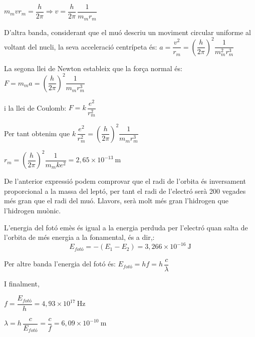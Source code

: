\begin{solapartat}
 $m_m v r_m = \dfrac{h}{2\pi} \Rightarrow v = \dfrac{h}{2\pi}\,\dfrac{1}{m_m r_m}$

 D'altra banda, considerant que el muó descriu un moviment circular uniforme al voltant del nucli, la seva acceleració centrípeta és: $a = \dfrac{v^2}{r_m} = \left(\dfrac{h}{2\pi}\right)^2\dfrac{1}{m_m^2 r_m^3}$

 La segona llei de Newton estableix que la força normal és: $F = m_m a = \left(\dfrac{h}{2\pi}\right)^2\dfrac{1}{m_m r_m^3}$

 i la llei de Coulomb: $F = k\,\dfrac{e^2}{r_m^2}$

 Per tant obtenim que $k\,\dfrac{e^2}{r_m^2} = \left(\dfrac{h}{2\pi}\right)^2\dfrac{1}{m_m r_m^3}$

$r_m = \left(\dfrac{h}{2\pi}\right)^2\dfrac{1}{m_m k e^2} = 2,65\times 10^{-13}\ \mathrm{m}$ \quad {}

 De l'anterior expressió podem comprovar que el radi de l'orbita és inversament proporcional a la massa del leptó, per tant el radi de l'electró serà 200 vegades més gran que el radi del muó. Llavors, serà molt més gran l'hidrogen que l'hidrogen muònic.
\end{solapartat}

\begin{solapartat}
 L'energia del fotó emès és igual a la energia perduda per l'electró quan salta de l'orbita de més energia a la fonamental, és a dir,:
\[ E_{\textit{fotó}} = -(E_1 - E_2) = 3,266\times 10^{-16}\ \mathrm{J} \]

 Per altre banda l'energia del fotó és: $E_{\textit{fotó}} = hf = h\,\dfrac{c}{\lambda}$

I finalment,

 $f = \dfrac{E_{\textit{fotó}}}{h} = 4,93\times 10^{17}\ \mathrm{Hz}$

 $\lambda = h\,\dfrac{c}{E_{\textit{fotó}}} = \dfrac{c}{f} = 6,09\times 10^{-10}\ \mathrm{m}$
\end{solapartat}
